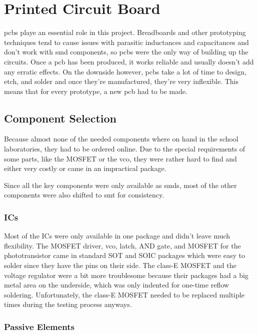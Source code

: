 \chapter{Printed Circuit Board}

\glspl{pcb} playe an essential role in this project. Breadboards and other prototyping techniques tend to cause issues with parasitic inductances and capacitances and don't work with \gls{smd} components, so \glspl{pcb} were the only way of building up the circuits. Once a \gls{pcb} has been produced, it works reliable and usually doesn't add any erratic effects. On the downside however, \glspl{pcb} take a lot of time to design, etch, and solder and once they're manufactured, they're very inflexible. This means that for every prototype, a new \gls{pcb} had to be made.

\section{Component Selection}

Because almost none of the needed components where on hand in the school laboratories, they had to be ordered online. Due to the special requirements of some parts, like the MOSFET or the \gls{vco}, they were rather hard to find and either very costly or came in an impractical package.

Since all the key components were only available as \glspl{smd}, most of the other components were also shifted to \gls{smt} for consistency.


\subsection{ICs}

Most of the ICs were only available in one package and didn't leave much flexibility. The MOSFET driver, \gls{vco}, latch, AND gate, and MOSFET for the phototransistor came in standard SOT and SOIC packages which were easy to solder since they have the pins on their side. The class-E MOSFET and the voltage regulator were a bit more troublesome because their packages had a big metal area on the underside, which was only indented for one-time reflow soldering. Unfortunately, the class-E MOSFET needed to be replaced multiple times during the testing process anyways.

\subsection{Passive Elements}

